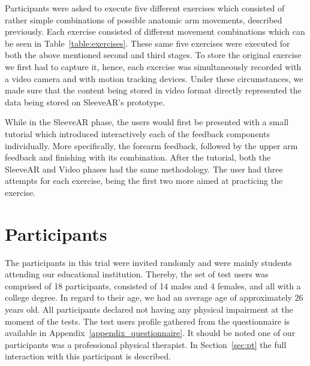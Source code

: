 Participants were asked to execute five different exercises which consisted of rather simple combinations of possible anatomic arm movements, described previously.
Each exercise consisted of different movement combinations which can be seen in Table~\ref{table:exercises}.
These same five exercises were executed for both the above mentioned second and third stages.
To store the original exercise we first had to capture it, hence, each exercise was simultaneously recorded with a video camera and with motion tracking devices. Under these circumstances, we made sure that the content being stored in video format directly represented the data being stored on SleeveAR's prototype.

While in the SleeveAR phase, the users would first be presented with a small tutorial which introduced interactively each of the feedback components individually. 
More specifically, the forearm feedback, followed by the upper arm feedback and finishing with its combination.
After the tutorial, both the SleeveAR and Video phases had the same methodology. 
The user had three attempts for each exercise, being the first two more aimed at practicing the exercise.

\begin{table}[!t]
\centering
{}
\caption{Arm movements in exercises.}
\label{table:exercises}
\end{table}


\section{Participants} 


The participants in this trial were invited randomly and were mainly students attending our educational
institution. Thereby, the set of test users was comprised of 18 participants, consisted of 14 males and 4 females,
and all with a college degree. In regard to their age, we had an average age of approximately 26 years old. 
All participants declared not having any physical impairment at the moment of the tests. 
The test users profile gathered from the questionnaire is available in Appendix~\ref{appendix_questionnaire}.
It should be noted one of our participants was a professional physical therapist. 
In Section~\ref{sec:pt} the full interaction with this participant is described.


